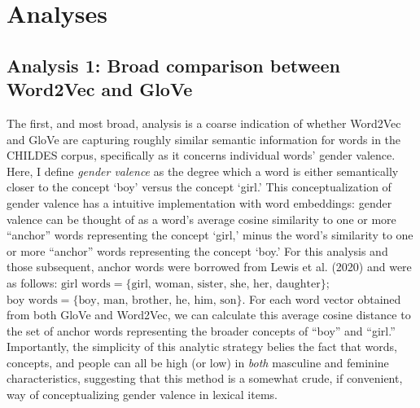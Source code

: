 \documentclass[10pt, letterpaper]{article}
\begin{document}
\hypertarget{analyses}{%
\section{Analyses}\label{analyses}}

\hypertarget{analysis-1-broad-comparison-between-word2vec-and-glove}{%
\subsection{Analysis 1: Broad comparison between Word2Vec and
GloVe}\label{analysis-1-broad-comparison-between-word2vec-and-glove}}

The first, and most broad, analysis is a coarse indication of whether
Word2Vec and GloVe are capturing roughly similar semantic information
for words in the CHILDES corpus, specifically as it concerns individual
words' gender valence. Here, I define \emph{gender valence} as the
degree which a word is either semantically closer to the concept `boy'
versus the concept `girl.' This conceptualization of gender valence has
a intuitive implementation with word embeddings: gender valence can be
thought of as a word's average cosine similarity to one or more
``anchor'' words representing the concept `girl,' minus the word's
similarity to one or more ``anchor'' words representing the concept
`boy.' For this analysis and those subsequent, anchor words were
borrowed from Lewis et al. (2020) and were as follows:
\(\text{girl words} = \{{\text{girl, woman, sister, she, her, daughter}}\}\);
\(\text{boy words} = \{{\text{boy, man, brother, he, him, son}}\}\). For
each word vector obtained from both GloVe and Word2Vec, we can calculate
this average cosine distance to the set of anchor words representing the
broader concepts of ``boy'' and ``girl.'' Importantly, the simplicity of
this analytic strategy belies the fact that words, concepts, and people
can all be high (or low) in \emph{both} masculine and feminine
characteristics, suggesting that this method is a somewhat crude, if
convenient, way of conceptualizing gender valence in lexical items.
\end{document}
